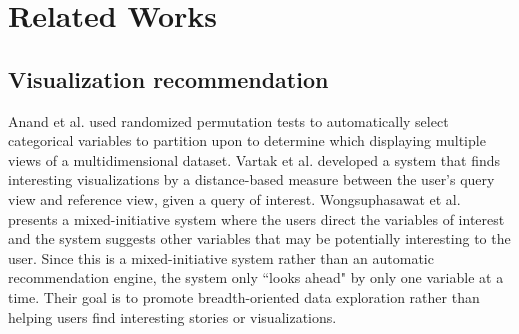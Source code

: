 \section{Related Works}
\subsection{Visualization recommendation}
\par%
Anand et al. \cite{Anand2015} used randomized permutation tests to automatically select categorical variables to partition upon to determine which displaying multiple views of a multidimensional dataset. Vartak et al. \cite{Vartak2015} developed a system that finds interesting visualizations by a distance-based measure between the user's query view and reference view,  given a query of interest. Wongsuphasawat et al. \cite{Wongsuphasawat2016} presents a mixed-initiative system where the users direct the variables of interest and the system suggests other variables that may be potentially interesting to the user. Since this is a mixed-initiative system rather than an automatic recommendation engine, the system only ``looks ahead"  by only one variable at a time. Their goal is to promote breadth-oriented data exploration rather than helping users find interesting stories or visualizations.

